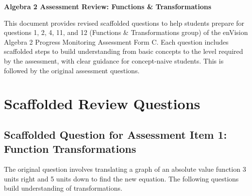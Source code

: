 \documentclass[12pt]{article}
\begin{document}
\begin{center}
    \textbf{Algebra 2 Assessment Review: Functions \& Transformations}
\end{center}

This document provides revised scaffolded questions to help students prepare for questions 1, 2, 4, 11, and 12 (Functions & Transformations group) of the enVision Algebra 2 Progress Monitoring Assessment Form C. Each question includes scaffolded steps to build understanding from basic concepts to the level required by the assessment, with clear guidance for concept-naive students. This is followed by the original assessment questions.

\section*{Scaffolded Review Questions}

\subsection*{Scaffolded Question for Assessment Item 1: Function Transformations}
The original question involves translating a graph of an absolute value function 3 units right and 5 units down to find the new equation. The following questions build understanding of transformations.
\end{document}
